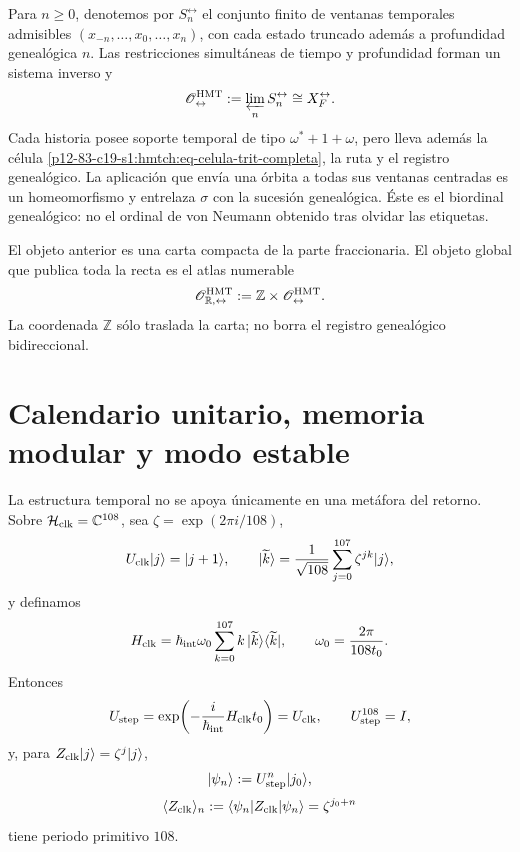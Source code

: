 Para \(n\geq0\), denotemos por \(S_n^{\leftrightarrow}\) el conjunto finito
de ventanas temporales admisibles
\((x_{-n},\ldots,x_0,\ldots,x_n)\), con cada estado truncado además a
profundidad genealógica \(n\). Las restricciones simultáneas de tiempo y
profundidad forman un
sistema inverso y
\begin{equation}
\mathscr O_{\leftrightarrow}^{\rm HMT}
 :=\varprojlim_n S_n^{\leftrightarrow}
 \cong X_F^{\leftrightarrow}.
 \label{p12-83-c19-s1:hmtch:eq-biordinal-genealogico}
\end{equation}
Cada historia posee soporte temporal de tipo
\(\omega^*+1+\omega\), pero lleva además la célula
\eqref{p12-83-c19-s1:hmtch:eq-celula-trit-completa}, la ruta y el registro genealógico. La aplicación
que envía una órbita a todas sus ventanas centradas es un homeomorfismo y
entrelaza \(\sigma\) con la sucesión genealógica. Éste es el biordinal
genealógico: no el ordinal de von Neumann obtenido tras olvidar las
etiquetas.

El objeto anterior es una carta compacta de la parte fraccionaria. El objeto
global que publica toda la recta es el atlas numerable
\begin{equation}
 \mathscr O_{\mathbb R,\leftrightarrow}^{\rm HMT}
 :=\mathbb Z\times\mathscr O_{\leftrightarrow}^{\rm HMT}.
 \label{p12-83-c19-s1:hmtch:eq-biordinal-global}
\end{equation}
La coordenada \(\mathbb Z\) sólo traslada la carta; no borra el registro genealógico
bidireccional.

\section{Calendario unitario, memoria modular y modo estable}

La estructura temporal no se apoya únicamente en una metáfora del retorno.
Sobre
\(\mathcal H_{\rm clk}=\mathbb C^{108}\), sea
\(\zeta=\exp(2\pi i/108)\),
\[
 U_{\rm clk}|j\rangle=|j+1\rangle,
 \qquad
 |\widetilde k\rangle
 =\frac1{\sqrt{108}}\sum_{j=0}^{107}\zeta^{jk}|j\rangle,
\]
y definamos
\begin{equation}
 H_{\rm clk}
 =\hbar_{\rm int}\omega_0
 \sum_{k=0}^{107}k\,|\widetilde k\rangle\langle\widetilde k|,
 \qquad
 \omega_0=\frac{2\pi}{108t_0}.
 \label{p12-83-c19-s1:hmtch:eq-hamiltoniano-reloj}
\end{equation}
Entonces
\begin{equation}
 U_{\rm step}
 =\exp\!\left(-\frac{i}{\hbar_{\rm int}}H_{\rm clk}t_0\right)
 =U_{\rm clk},
 \qquad U_{\rm step}^{108}=I,
 \label{p12-83-c19-s1:hmtch:eq-propagador-reloj}
\end{equation}
y, para
\(Z_{\rm clk}|j\rangle=\zeta^j|j\rangle\),
\[
 |\psi_n\rangle:=U_{\rm step}^n|j_0\rangle,
\]
\begin{equation}
 \langle Z_{\rm clk}\rangle_n
 :=\langle\psi_n|Z_{\rm clk}|\psi_n\rangle
 =\zeta^{j_0+n}
 \label{p12-83-c19-s1:hmtch:eq-respuesta-primitiva-108}
\end{equation}
tiene periodo primitivo \(108\).

